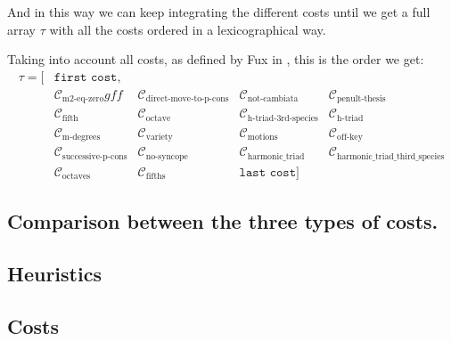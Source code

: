 And in this way we can keep integrating the different costs until we get a full array $\tau$ with all the costs ordered in a lexicographical way.

Taking into account all costs, as defined by Fux in \gap, this is the order we get:
\begin{equation}
    \begin{aligned}
        \tau = [&\texttt{first cost},\\
        &\mathcal{C}_\text{m2-eq-zero}
        gff&\mathcal{C}_\text{direct-move-to-p-cons}
        &\mathcal{C}_\text{not-cambiata}
        &\mathcal{C}_\text{penult-thesis}\\
        &\mathcal{C}_\text{fifth}
        &\mathcal{C}_\text{octave}
        &\mathcal{C}_\text{h-triad-3rd-species}
        &\mathcal{C}_\text{h-triad}\\
        &\mathcal{C}_\text{m-degrees}
        &\mathcal{C}_\text{variety} 
        &\mathcal{C}_\text{motions}
        &\mathcal{C}_\text{off-key}\\
        &\mathcal{C}_\text{successive-p-cons}
        &\mathcal{C}_\text{no-syncope}
        &\mathcal{C}_\text{harmonic\_triad} 
        &\mathcal{C}_\text{harmonic\_triad\_third\_species} \\
        &\mathcal{C}_\text{octaves} 
        &\mathcal{C}_\text{fifths} 
        &\texttt{last cost}] 
    \end{aligned}
\end{equation}

\subsection*{Comparison between the three types of costs.}

\begin{table}[ht]
    \centering
    \caption{Comparison of Options A, B, and C}
    \label{tab:comparison}
\end{table}


\subsection{Heuristics}

\subsection{Costs} \label{costs}
